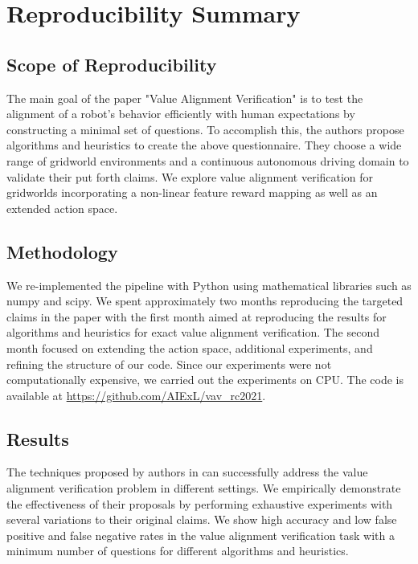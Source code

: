 \newtheorem{thm}{Theorem}
\newtheorem{corollary}{Corollary}
\newtheorem{defn}{Definition}
\newtheorem{lemma}{Lemma}
\newtheorem{case}{Case}


\section*{\centering Reproducibility Summary}

\subsection*{Scope of Reproducibility}
The main goal of the paper "Value Alignment Verification" \cite{brown2021value} is to test the alignment of a robot's behavior efficiently with human expectations by constructing a minimal set of questions. To accomplish this, the authors propose algorithms and heuristics to create the above questionnaire. They choose a wide range of gridworld environments and a continuous autonomous driving domain to validate their put forth claims. We explore value alignment verification for gridworlds incorporating a non-linear feature reward mapping as well as an extended action space.

\subsection*{Methodology}

We re-implemented the pipeline with Python using mathematical libraries such as \\ numpy and scipy. We spent approximately two months reproducing the targeted claims in the paper with the first month aimed at  reproducing the results for algorithms and heuristics for exact value alignment verification. The second month focused on extending  the action space, additional experiments, and refining the structure of our code. Since our experiments were not computationally  expensive, we carried out the experiments on CPU. The code is available at {\url{https://github.com/AIExL/vav_rc2021}}.

\subsection*{Results}
The techniques proposed by authors in \cite{brown2021value} can successfully address the value alignment verification problem in different settings. We empirically demonstrate the effectiveness of their proposals by performing exhaustive experiments with several variations to their original claims. We show high accuracy and low false positive and false negative rates in the value alignment verification task with a minimum number of questions for different algorithms and heuristics.

